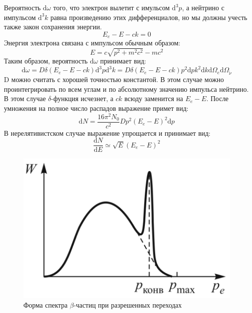 \documentclass[a4paper,12pt]{article}
\newcommand{\dif}{\mathrm{d}}
\begin{document}
		Вероятность $\dif\omega$ того, что электрон вылетит с имульсом $\dif^3p$, а нейтрино с импульсом $\dif^3k$ равна произведению этих дифференциалов, но мы должны учесть также закон сохранения энергии.
		\begin{equation}
		    E_e - E - ck = 0
		\end{equation}
		Энергия электрона связана с импульсом обычным образом:
		\begin{equation}
		    E = c\sqrt{p^2 + m^2c^2} -mc^2
		\end{equation}
		Таким образом, вероятность $\dif\omega$ принимает вид:
		\begin{equation}
		    \dif\omega = D\delta(E_e-E-ck)\dif^3p\dif^3k = D\delta(E_e-E-ck)p^2\dif pk^2\dif k\dif\Omega_e\dif\Omega_{\widetilde{\nu}}
		\end{equation}
		D можно считать с хорошей точностью константой. В этом случае можно проинтегрировать по всем углам и по абсолютному значению импульса нейтрино. В этом случае $\delta$-функция исчезнет, а $ck$ всюду заменится на $E_e-E$. После умножения на полное число распадов выражение примет вид:
		\begin{equation}
		    \dif N = \frac{16\pi^2N_0}{c^2} D p^2\left(E_e-E\right)^2\dif p
		\end{equation}
		В нерелятивистском случае выражение упрощается и принимает вид:
		\begin{equation}
			\frac{\dif N}{\dif E} \simeq \sqrt{E}(E_e - E)^2
		\end{equation} 
		\begin{figure}[h!]
			\centering
			\includegraphics[width=0.6\linewidth]{pic1}
			\caption{Форма спектра $\beta$-частиц при разрешенных переходах}
		\end{figure}
\end{document}

